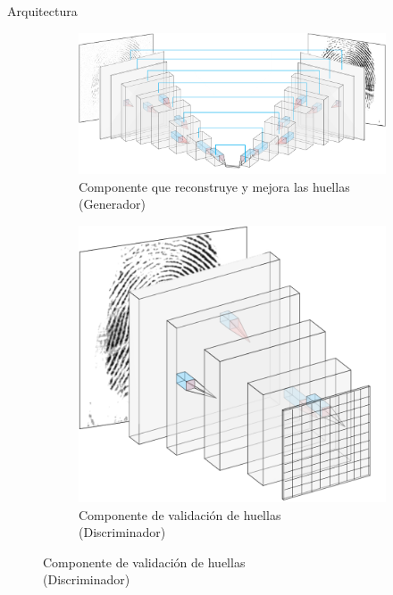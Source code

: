 \documentclass[12pt,aspectratio=169]{beamer}
\begin{document}
\begin{frame}{Arquitectura}

   \begin{figure}
        \begin{subfigure}{0.62\textwidth}
            \centering
            \includegraphics[scale=0.34]{figs/layers_nn_u.PNG}
            \caption{Componente que reconstruye y mejora las huellas \\ (Generador)}
        \end{subfigure}
        \begin{subfigure}{0.36\textwidth}
            \centering
            \includegraphics[scale=0.25]{figs/disc_cuad.png}
            \caption{Componente de validación de huellas \\ (Discriminador)}
        \end{subfigure}
    \end{figure}

\end{frame}
\end{document}
